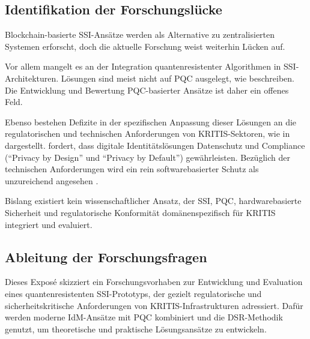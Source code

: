 \subsection*{Identifikation der Forschungslücke} \label{sec:Identifikation der Forschungslücke}

Blockchain-basierte \ac{SSI}-Ansätze werden als Alternative zu zentralisierten Systemen erforscht, doch die aktuelle Forschung weist weiterhin Lücken auf.

Vor allem mangelt es an der Integration quantenresistenter Algorithmen in SSI-Architekturen. Lösungen sind meist nicht auf \ac{PQC} ausgelegt, wie \textcite[S. 2]{dutto_PostQuantumZeroKnowledgeVerifiableCredentialSystemSelfSovereignIdentity_2022} beschreiben. Die Entwicklung und Bewertung \ac{PQC}-basierter Ansätze ist daher ein offenes Feld.

Ebenso bestehen Defizite in der spezifischen Anpassung dieser Lösungen an die regulatorischen und technischen Anforderungen von \ac{KRITIS}-Sektoren, wie in \textcite[Kap. 2.5 \& 2.6]{bundesamtfursicherheitinderinformationstechnikbsi_KonkretisierungAnforderungenUndMassnahmengemass8aAbsatz1undAbsatz1aBSIG_2024} dargestellt. \textcite[S. 10]{derbundesbeauftragtefuerdendatenschutzunddieinformationsfreiheitbfdi_AntwortenBundesbeauftragtenFuerDatenschutzundInformationsfreiheitaufFragenzuroeffentlichenSachverstaendigenanhoerungAusschusses_2022} fordert, dass digitale Identitätslösungen Datenschutz und Compliance (\enquote{Privacy by Design} und \enquote{Privacy by Default}) gewährleisten. Bezüglich der technischen Anforderungen wird ein rein softwarebasierter Schutz als unzureichend angesehen \parencite[S. 6]{derbundesbeauftragtefuerdendatenschutzunddieinformationsfreiheitbfdi_AntwortenBundesbeauftragtenFuerDatenschutzundInformationsfreiheitaufFragenzuroeffentlichenSachverstaendigenanhoerungAusschusses_2022}.

Bislang existiert kein wissenschaftlicher Ansatz, der \ac{SSI}, \ac{PQC}, hardwarebasierte Sicherheit und regulatorische Konformität domänenspezifisch für \ac{KRITIS} integriert und evaluiert.

\subsection*{Ableitung der Forschungsfragen} \label{sec:Ableitung der Forschungsfragen}

Dieses Exposé skizziert ein Forschungsvorhaben zur Entwicklung und Evaluation eines quantenresistenten \ac{SSI}-Prototyps, der gezielt regulatorische und sicherheitskritische Anforderungen von \ac{KRITIS}-Infrastrukturen adressiert. Dafür werden moderne \ac{IdM}-Ansätze mit \ac{PQC} kombiniert und die \ac{DSR}-Methodik genutzt, um theoretische und praktische Lösungsansätze zu entwickeln.

